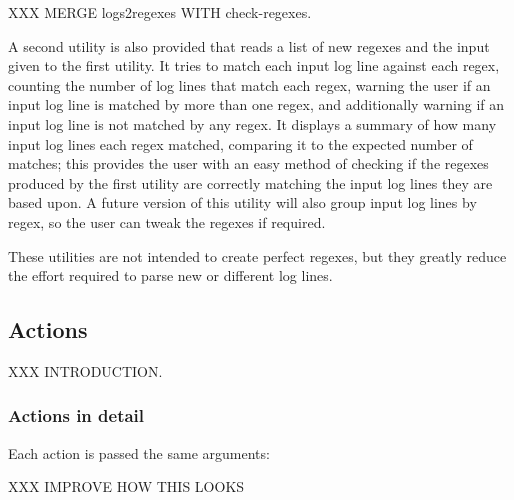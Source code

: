 XXX MERGE logs2regexes WITH check-regexes.

A second utility is also provided that reads a list of new regexes and
the input given to the first utility.  It tries to match each input log
line against each regex, counting the number of log lines that match
each regex, warning the user if an input log line is matched by more
than one regex, and additionally warning if an input log line is not
matched by any regex.  It displays a summary of how many input log lines
each regex matched, comparing it to the expected number of matches; this
provides the user with an easy method of checking if the regexes
produced by the first utility are correctly matching the input log lines
they are based upon.  A future version of this utility will also group
input log lines by regex, so the user can tweak the regexes if
required.

These utilities are not intended to create perfect regexes, but they
greatly reduce the effort required to parse new or different log lines.

\subsection{Actions}

\label{actions in implementation}

XXX INTRODUCTION\@.

\subsubsection{Actions in detail}

\label{actions-in-detail}

Each action is passed the same arguments:


XXX IMPROVE HOW THIS LOOKS


